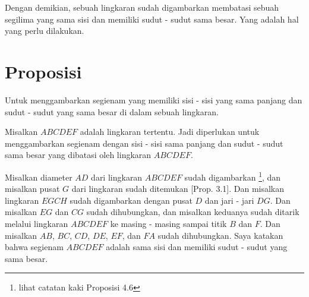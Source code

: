 \documentclass[a4paper]{book}
\begin{document}
Dengan demikian, sebuah lingkaran sudah digambarkan membatasi sebuah segilima 
yang sama sisi dan memiliki sudut - sudut sama besar. Yang adalah hal yang 
perlu dilakukan.

\section*{\centering Proposisi \thesection}
Untuk menggambarkan segienam yang memiliki sisi - sisi yang sama panjang
dan sudut - sudut yang sama besar di dalam sebuah lingkaran.
\begin{center} 
\end{center} 

Misalkan $ABCDEF$ adalah lingkaran tertentu. Jadi diperlukan untuk 
menggambarkan segienam dengan sisi - sisi sama panjang dan sudut - sudut sama
besar yang dibatasi oleh lingkaran $ABCDEF$.

Misalkan diameter $AD$ dari lingkaran $ABCDEF$ sudah digambarkan
\footnote{lihat catatan kaki Proposisi 4.6}, dan misalkan pusat $G$ dari 
lingkaran sudah ditemukan [Prop. 3.1]. Dan misalkan lingkaran $EGCH$ sudah
digambarkan dengan pusat $D$ dan jari - jari $DG$. Dan misalkan $EG$ dan $CG$
sudah dihubungkan, dan misalkan keduanya sudah ditarik melalui lingkaran 
$ABCDEF$ ke masing - masing sampai titik $B$ dan $F$. Dan misalkan $AB$, 
$BC$, $CD$, $DE$, $EF$, dan $FA$ sudah dihubungkan. 
Saya katakan bahwa segienam $ABCDEF$ adalah sama sisi dan memiliki sudut - 
sudut yang sama besar.
\end{document}
